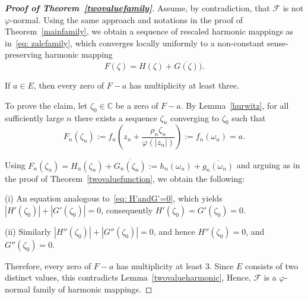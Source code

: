 \documentclass[10pt,a4paper]{amsart}
\numberwithin{equation}{section}
\begin{document}
\begin{proof}[\bf{Proof of Theorem~\ref{twovaluefamily}}]
  Assume, by contradiction, that $\mathcal{F}$ is not $\varphi$-normal.
  Using the same approach and notations in the proof of 
  Theorem~\ref{mainfamily}, we obtain
   a sequence of rescaled harmonic mappings as in~\eqref{eq: zalcfamily}, which
  converges locally uniformly to a non-constant sense-preserving
  harmonic mapping
  \[
  F(\zeta)=H(\zeta)+\overline{G(\zeta)}).
  \] 

 If $a\in E$, then every zero of $F-a$ has 
multiplicity at least three.

 To prove the claim, let
  $\zeta_0\in \mathbb{C}$ be a zero of $F-a$. By 
  Lemma~\ref{hurwitz}, for all sufficiently large $n$ 
there exists a sequence $\zeta_n$ 
converging to $\zeta_0$ such that
  \[F_n(\zeta_n):=f_n\!\left(z_n+\frac{\rho_n\zeta_n}
{\varphi(|z_n|)}\right):=f_n(\omega_n)=a.
  \]

Using $F_n(\zeta_n)=H_n(\zeta_n)+\overline{G_n(\zeta_n)}:=
 h_n(\omega_n)+\overline{g_n(\omega_n)}$ and arguing as in the proof of 
 Theorem~\ref{twovaluefunction}, we obtain the following: \smallskip
 
\noindent (i) An equation analogous to~\eqref{eq: H'andG'=0}, which yields
$|H'(\zeta_0)|+|G'(\zeta_0)|=0$,  consequently $H'(\zeta_0)=G'(\zeta_0)=0.$

\noindent (ii) Similarly $|H''(\zeta_0)|+|G''(\zeta_0)|=0$, and hence
$H''(\zeta_0)=0$, 
and $G''(\zeta_0)=0$.\smallskip

 Therefore, every zero of $F-a$ has multiplicity at least 3. Since $E$ 
  consists of two distinct values, this contradicts Lemma~\ref{twovalueharmonic}, 
  Hence, $\mathcal{F}$ is a $\varphi$-normal family of harmonic mappings.
\end{proof}
\medskip

\end{document}
